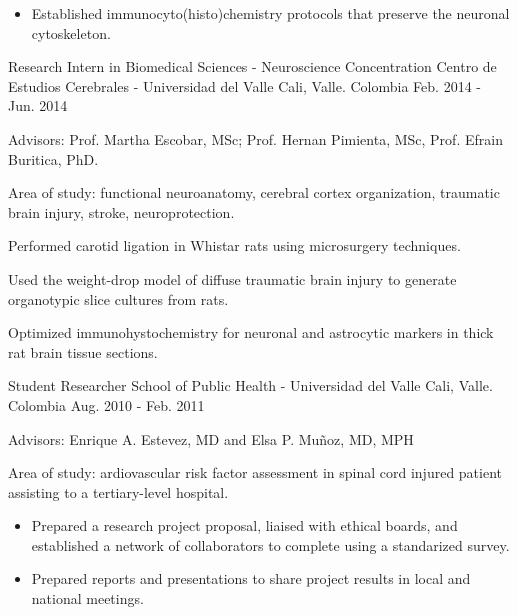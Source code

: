 \begin{cventries}
{\begin{cvitems}
\begin{itemize}
\begin{itemize}
            \item {Established immunocyto(histo)chemistry protocols that preserve the neuronal cytoskeleton.}
            \end{itemize}
        \end{itemize}
      \end{cvitems}
      }
  \cventry
    {Research Intern in Biomedical Sciences - Neuroscience Concentration} %
    {Centro de Estudios Cerebrales - Universidad del Valle} %
    {Cali, Valle. Colombia} %
    {Feb. 2014 - Jun. 2014} %
    {
      \begin{cvitems} %
        \item {Advisors: Prof. Martha Escobar, MSc; Prof. Hernan Pimienta, MSc, Prof. Efrain Buritica, PhD.}
        \item {Area of study: functional neuroanatomy, cerebral cortex organization, traumatic brain injury, stroke, neuroprotection.}
        \item {Performed carotid ligation in Whistar rats using microsurgery techniques.}
        \item {Used the weight-drop model of diffuse traumatic brain injury to generate organotypic slice cultures from rats.}
        \item {Optimized immunohystochemistry for neuronal and astrocytic markers in thick rat brain tissue sections.}
      \end{cvitems}
    }
\vspace{10pt}
  \cventry
  {Student Researcher} %
  {School of Public Health - Universidad del Valle} %
  {Cali, Valle. Colombia} %
  {Aug. 2010 - Feb. 2011} %
  {
  \begin{cvitems} %
    \item {Advisors: Enrique A. Estevez, MD and Elsa P. Muñoz, MD, MPH}
    \item {Area of study: ardiovascular risk factor assessment in spinal cord injured patient assisting to a tertiary-level
    hospital.}
    \begin{itemize}
      \item {Prepared a research project proposal, liaised with ethical boards, and established a network of collaborators to complete using a standarized survey.}
      \item {Prepared reports and presentations to share project results in local and national meetings.}

\end{itemize}
\end{cvitems}}
\end{cventries}
